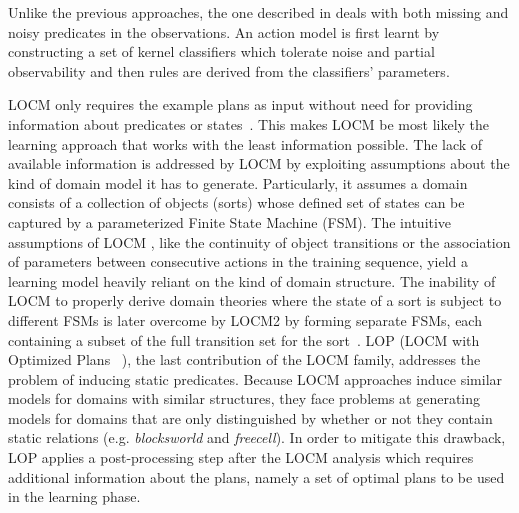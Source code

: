 Unlike the previous approaches, the one described in \cite{MouraoZPS12} deals with both missing and noisy predicates in the observations. An action model is first learnt by constructing a set of kernel classifiers which tolerate noise and partial observability and then \strips rules are derived from the classifiers' parameters.

{\sf LOCM} only requires the example plans as input without need for providing information about predicates or states~\cite{cresswell2013acquiring}. This makes {\sf LOCM} be most likely the learning approach that works with the least information possible. The lack of available information is addressed by LOCM by exploiting assumptions about the kind of domain model it has to generate. Particularly, it assumes a domain consists of a collection of objects (sorts) whose defined set of states can be captured by a parameterized Finite State Machine (FSM). The intuitive assumptions of {\sf LOCM}
, like the continuity of object transitions or the association of parameters between consecutive actions in the training sequence,
yield a learning model heavily reliant on the kind of domain structure. The inability of {\sf LOCM} to properly derive domain theories where the state of a sort is subject to different FSMs is later overcome by {\sf LOCM2} by forming separate FSMs, each containing a subset of the full transition set for the sort~\cite{cresswell2011generalised}. {\sf LOP} ({\sf LOCM} with Optimized Plans ~\cite{gregory2015domain}), the last contribution of the {\sf LOCM} family, addresses the problem of inducing static predicates. Because {\sf LOCM} approaches induce similar models for domains with similar structures, they face problems at generating models for domains that are only distinguished by whether or not they contain static relations (e.g. {\em blocksworld} and {\em freecell}). In order to mitigate this drawback, {\sf LOP} applies a post-processing step after the {\sf LOCM} analysis which requires additional information about the plans, namely a set of optimal plans to be used in the learning phase.

